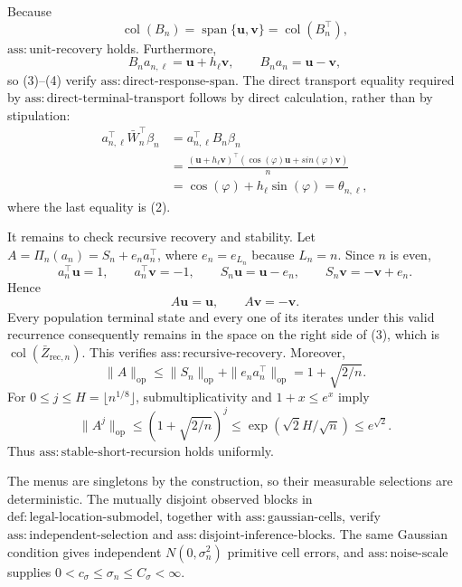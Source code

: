 Because
\[
 \operatorname{col}(B_n)=\operatorname{span}\{\boldsymbol u,\boldsymbol v\}
 =\operatorname{col}(B_n^{\top}),                             \tag{3}
\]
\(\mathrm{ass{:}unit\mbox{-}recovery}\) holds.  Furthermore,
\[
 B_na_{n,\ell}=\boldsymbol u+h_\ell\boldsymbol v,
 \qquad B_na_n=\boldsymbol u-\boldsymbol v,                   \tag{4}
\]
so (3)--(4) verify \(\mathrm{ass{:}direct\mbox{-}response\mbox{-}span}\).
The direct transport equality required by
\(\mathrm{ass{:}direct\mbox{-}terminal\mbox{-}transport}\) follows by direct
calculation, rather than by stipulation:
\[
\begin{aligned}
 a_{n,\ell}^{\top}\bar W_n^{\top}\beta_n
 &=a_{n,\ell}^{\top}B_n\beta_n\\
 &=\frac{(\boldsymbol u+h_\ell\boldsymbol v)^{\top}
              (\cos(\varphi)\boldsymbol u+sin(\varphi)\boldsymbol v)}{n}\\
 &=\cos(\varphi)+h_\ell\sin(\varphi)
 =\theta_{n,\ell},
\end{aligned}                                                  \tag{5}
\]
where the last equality is (2).

It remains to check recursive recovery and stability.  Let
\(A=\Pi_n(a_n)=S_n+e_na_n^{\top}\), where \(e_n=e_{L_n}\) because
\(L_n=n\).  Since \(n\) is even,
\[
 a_n^{\top}\boldsymbol u=1,
 \qquad a_n^{\top}\boldsymbol v=-1,
 \qquad S_n\boldsymbol u=\boldsymbol u-e_n,
 \qquad S_n\boldsymbol v=-\boldsymbol v+e_n.
\]
Hence
\[
 A\boldsymbol u=\boldsymbol u,
 \qquad A\boldsymbol v=-\boldsymbol v.                       \tag{6}
\]
Every population terminal state and every one of its iterates under this valid
recurrence consequently remains in the space on the right side of (3), which
is \(\operatorname{col}(\bar Z_{\mathrm{rec},n})\).  This verifies
\(\mathrm{ass{:}recursive\mbox{-}recovery}\).  Moreover,
\[
 \|A\|_{\mathrm{op}}
 \leq \|S_n\|_{\mathrm{op}}+\|e_na_n^{\top}\|_{\mathrm{op}}
 =1+\sqrt{2/n}.
\]
For \(0\leq j\leq H=\lfloor n^{1/8}\rfloor\), submultiplicativity and
\(1+x\leq e^x\) imply
\[
 \|A^j\|_{\mathrm{op}}
 \leq(1+\sqrt{2/n})^j
 \leq\exp(\sqrt2 H/\sqrt n)
 \leq e^{\sqrt2}.                                             \tag{7}
\]
Thus \(\mathrm{ass{:}stable\mbox{-}short\mbox{-}recursion}\) holds uniformly.

The menus are singletons by the construction, so their measurable selections
are deterministic.  The mutually disjoint observed blocks in
\(\mathrm{def{:}legal\mbox{-}location\mbox{-}submodel}\), together with
\(\mathrm{ass{:}gaussian\mbox{-}cells}\), verify
\(\mathrm{ass{:}independent\mbox{-}selection}\) and
\(\mathrm{ass{:}disjoint\mbox{-}inference\mbox{-}blocks}\).  The same Gaussian
condition gives independent \(N(0,\sigma_n^2)\) primitive cell errors, and
\(\mathrm{ass{:}noise\mbox{-}scale}\) supplies
\(0<c_\sigma\leq\sigma_n\leq C_\sigma<\infty\).

